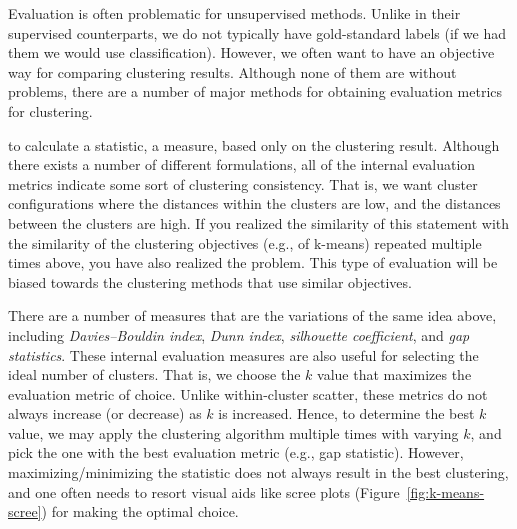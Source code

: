 Evaluation is often problematic for unsupervised methods.
Unlike in their supervised counterparts,
we do not typically have gold-standard labels
(if we had them we would use classification).
However, we often want to have an objective way
for comparing clustering results.
Although none of them are without problems,
there are a number of major methods
for obtaining evaluation metrics for clustering.

to calculate a statistic, a measure,
based only on the clustering result.
Although there exists a number of different formulations,
all of the internal evaluation metrics indicate
some sort of clustering consistency.
That is, we want cluster configurations where
the distances within the clusters are low,
and the distances between the clusters are high.
If you realized the similarity of this statement
with the similarity of the clustering objectives (e.g., of k-means)
repeated multiple times above,
you have also realized the problem.
This type of evaluation will be biased
towards the clustering methods that use similar objectives.

There are a number of measures
that are the variations of the same idea above,
including \emph{Davies–Bouldin index}, \emph{Dunn index},
\emph{silhouette coefficient},
and \emph{gap statistics}.
These internal evaluation measures are also
useful for selecting the ideal number of clusters.
That is,
we choose the $k$ value that maximizes the evaluation metric of choice.
Unlike within-cluster scatter,
these metrics do not always increase (or decrease) as $k$ is increased.
Hence, to determine the best $k$ value,
we may apply the clustering algorithm multiple times with varying $k$,
and pick the one with the best evaluation metric (e.g., gap statistic).
However, maximizing/minimizing the statistic does not always result in
the best clustering,
and one often needs to resort visual aids like scree plots
(Figure~\ref{fig:k-means-scree})
for making the optimal choice.

